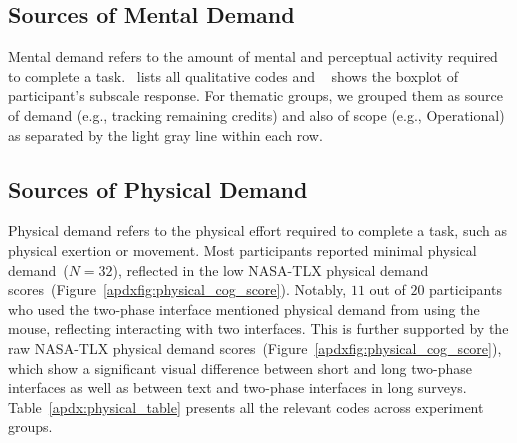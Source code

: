 \subsection{Sources of Mental Demand}
\label{apdx:mental}
Mental demand refers to the amount of mental and perceptual activity required to complete a task.~ lists all qualitative codes and ~ shows the boxplot of participant's subscale response. For thematic groups, we grouped them as source of demand (e.g., tracking remaining credits) and also of scope (e.g., Operational) as separated by the light gray line within each row.

\subsection{Sources of Physical Demand} 
\label{apdx:physical}
Physical demand refers to the physical effort required to complete a task, such as physical exertion or movement. Most participants reported minimal physical demand~($N=32$), reflected in the low NASA-TLX physical demand scores~(Figure~\ref{apdxfig:physical_cog_score}). Notably, $11$ out of $20$ participants who used the two-phase interface mentioned physical demand from using the mouse, reflecting interacting with two interfaces. This is further supported by the raw NASA-TLX physical demand scores~(Figure~\ref{apdxfig:physical_cog_score}), which show a significant visual difference between short and long two-phase interfaces as well as between text and two-phase interfaces in long surveys. Table~\ref{apdx:physical_table} presents all the relevant codes across experiment groups.





